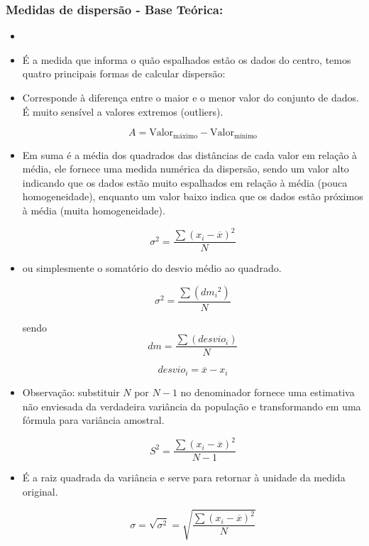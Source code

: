 \documentclass[a4paper,11pt]{article}
\begin{document}
\subsubsection*{Medidas de dispersão - Base Teórica:} 
\begin{itemize}
\item[]

    \item É a medida que informa o quão espalhados estão os dados do centro, temos quatro principais formas de calcular dispersão:

    \item Corresponde à diferença entre o maior e o menor valor do conjunto de dados. É muito sensível a valores extremos (outliers).

     \[ A = \text{Valor}_{\text{máximo}} -\text{Valor}_{\text{mínimo}} \]
    
    \item Em suma é a média dos quadrados das distâncias de cada valor em relação à média, ele fornece uma medida numérica da dispersão, sendo um valor alto indicando que os dados estão muito espalhados em relação à média (pouca homogeneidade), enquanto um valor baixo indica que os dados estão próximos à média (muita homogeneidade). 

    \[\sigma^2 = \frac{\sum (x_i - \overline{x})^2}{N}\]

    \item ou simplesmente o somatório do desvio médio ao quadrado.

    \[\sigma^2 = \frac{\sum (dm_i{^2})}{N}\]

    sendo 
    \[dm = \frac{\sum (desvio_i)}{N}\] 

    \[desvio_i = \overline{x} - x_i\]

    \item Observação: substituir $N$ por $N-1$ no denominador fornece uma estimativa não enviesada da verdadeira variância da população e transformando em uma fórmula para variância amostral.

    \[S^2 = \frac{\sum (x_i - \overline{x})^2}{N-1}\]

    \item É a raiz quadrada da variância e serve para retornar à unidade da medida original. 

    \[\sigma = \sqrt {\sigma^2} = \sqrt{\frac{\sum (x_i - \overline{x})^2}{N}}\]


\end{itemize}
\end{document}
